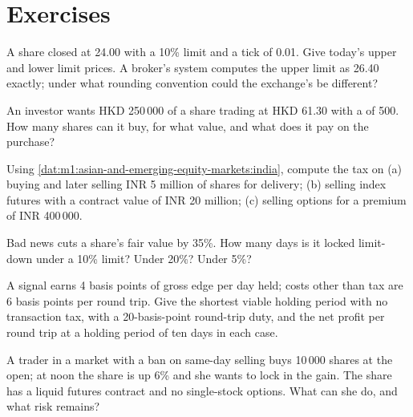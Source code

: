 \section{Exercises}

\begin{exercise}[$\star$]\label{exo:m1:asian-and-emerging-equity-markets:1}
A share closed at 24.00 with a 10\% limit and a tick of 0.01. Give today's
upper and lower limit prices. A broker's system computes the upper limit as
26.40 exactly; under what rounding convention could the exchange's be
different?
\end{exercise}

\begin{exercise}[$\star$]\label{exo:m1:asian-and-emerging-equity-markets:2}
An investor wants HKD 250\,000 of a share trading at HKD 61.30 with a  of 500. How many shares can it buy, for what value, and what 
does it pay on the purchase?
\end{exercise}

\begin{exercise}[$\star$]\label{exo:m1:asian-and-emerging-equity-markets:3}
Using \cref{dat:m1:asian-and-emerging-equity-markets:india}, compute the tax
on (a) buying and later selling INR 5 million of shares for delivery; (b)
selling index futures with a contract value of INR 20 million; (c) selling
options for a premium of INR 400\,000.
\end{exercise}

\begin{exercise}[$\star\star$]\label{exo:m1:asian-and-emerging-equity-markets:4}
Bad news cuts a share's fair value by 35\%. How many days is it locked
limit-down under a 10\% limit? Under 20\%? Under 5\%?
\end{exercise}

\begin{exercise}[$\star\star$]\label{exo:m1:asian-and-emerging-equity-markets:5}
A signal earns 4 basis points of gross edge per day held; costs other than
tax are 6 basis points per round trip. Give the shortest viable holding
period with no transaction tax, with a 20-basis-point round-trip duty, and
the net profit per round trip at a holding period of ten days in each case.
\end{exercise}

\begin{exercise}[$\star\star$]\label{exo:m1:asian-and-emerging-equity-markets:6}
A trader in a market with a ban on same-day selling buys 10\,000 shares at
the open; at noon the share is up 6\% and she wants to lock in the gain. The
share has a liquid futures contract and no single-stock options. What can she
do, and what risk remains?
\end{exercise}

